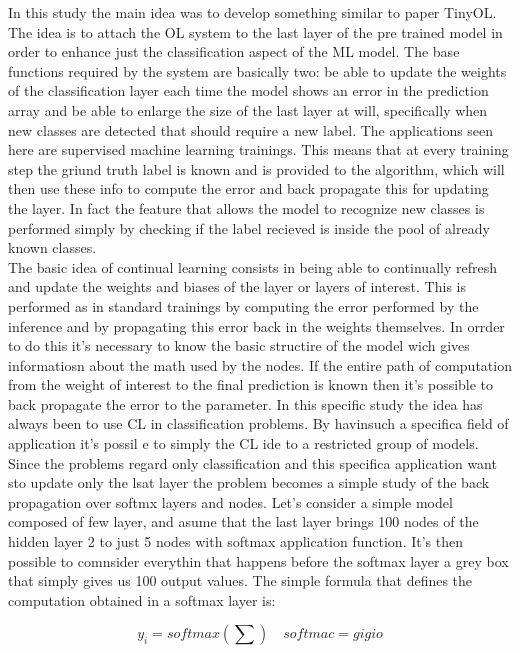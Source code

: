 \documentclass[12pt]{report}
\begin{document}
In this study the main idea was to develop something similar to paper TinyOL. The idea is to attach the OL system to the last layer of the pre trained model in order to enhance just the classification aspect of the ML model. The base functions required by the system are basically two: be able to update the weights of the classification layer each time the model shows an error in the prediction array and be able to enlarge the size of the last layer at will, specifically when new classes are detected that should require a new label. The applications seen here are supervised machine learning trainings. This means that at every training step the griund truth label is known and is provided to the algorithm, which will then use these info to compute the error and back propagate this for updating the layer. In fact the feature that allows the model to recognize new classes is performed simply by checking if the label recieved is inside the pool of already known classes. \\
The basic idea of continual learning consists in being able to continually refresh and update the weights and biases of the layer or layers of interest. This is performed as in standard trainings by computing the error performed by the inference and by propagating this error back in the weights themselves. In orrder to do this it's necessary to know the basic structire of the model wich gives informatiosn about the math used by the nodes. If the entire path of computation from the weight of interest to the final prediction is known then it's possible to back propagate the error to the parameter. In this specific study the idea has always been to use CL in classification problems. By havinsuch a specifica field of application it's possil e to simply the CL ide to a restricted group of models. Since the problems regard only classification and this specifica application want sto update only the lsat layer the problem becomes a simple study of the back propagation over softmx layers and nodes. Let's consider a simple model composed of few layer, and asume that the last layer brings 100 nodes of the hidden layer 2 to just 5 nodes with softmax application function. It's then possible to comnsider everythin that happens before the softmax layer a grey box that simply gives us 100 output values. The simple formula that defines the computation obtained in a softmax layer is:

\begin{equation}
y_i = softmax(\sum ) \quad softmac = gigio
\end{equation}
\end{document}
